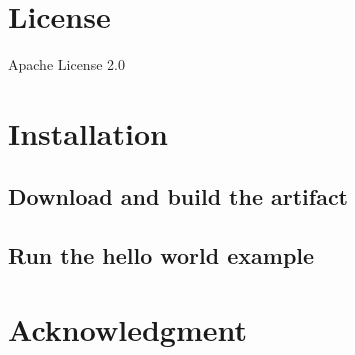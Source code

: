 \documentclass[10pt,conference]{IEEEtran}
\begin{document}
\section{License}
Apache License 2.0

\section{Installation}

\subsection{Download and build the artifact}

\subsection{Run the hello world example}


\section*{Acknowledgment}





\end{document}

